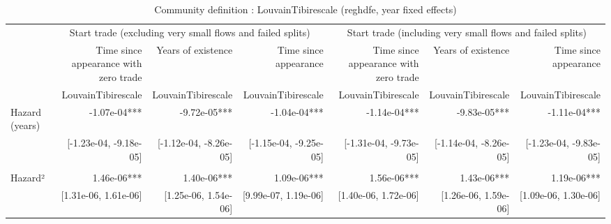 \begin{table}[!h]
\caption{Community definition : LouvainTibirescale (reghdfe, year fixed effects)}
\centering
\begin{tabular}{lllllll}
\cline{1-7}
\multicolumn{1}{c}{} &
  \multicolumn{3}{|c}{Start trade (excluding very small flows and failed splits)} &
  \multicolumn{3}{c}{Start trade (including very small flows and failed splits)} \\
\multicolumn{1}{c}{} &
  \multicolumn{1}{|r}{Time since appearance with zero trade} &
  \multicolumn{1}{r}{Years of existence} &
  \multicolumn{1}{r}{Time since appearance} &
  \multicolumn{1}{r}{Time since appearance with zero trade} &
  \multicolumn{1}{r}{Years of existence} &
  \multicolumn{1}{r}{Time since appearance} \\
\multicolumn{1}{c}{} &
  \multicolumn{1}{|r}{LouvainTibirescale} &
  \multicolumn{1}{r}{LouvainTibirescale} &
  \multicolumn{1}{r}{LouvainTibirescale} &
  \multicolumn{1}{r}{LouvainTibirescale} &
  \multicolumn{1}{r}{LouvainTibirescale} &
  \multicolumn{1}{r}{LouvainTibirescale} \\
\cline{1-7}
\multicolumn{1}{l}{Hazard (years)} &
  \multicolumn{1}{|r}{-1.07e-04***} &
  \multicolumn{1}{r}{-9.72e-05***} &
  \multicolumn{1}{r}{-1.04e-04***} &
  \multicolumn{1}{r}{-1.14e-04***} &
  \multicolumn{1}{r}{-9.83e-05***} &
  \multicolumn{1}{r}{-1.11e-04***} \\
\multicolumn{1}{l}{} &
  \multicolumn{1}{|r}{[-1.23e-04, -9.18e-05]} &
  \multicolumn{1}{r}{[-1.12e-04, -8.26e-05]} &
  \multicolumn{1}{r}{[-1.15e-04, -9.25e-05]} &
  \multicolumn{1}{r}{[-1.31e-04, -9.73e-05]} &
  \multicolumn{1}{r}{[-1.14e-04, -8.26e-05]} &
  \multicolumn{1}{r}{[-1.23e-04, -9.83e-05]} \\
\multicolumn{1}{l}{} &
  \multicolumn{1}{|r}{} &
  \multicolumn{1}{r}{} &
  \multicolumn{1}{r}{} &
  \multicolumn{1}{r}{} &
  \multicolumn{1}{r}{} &
  \multicolumn{1}{r}{} \\
\multicolumn{1}{l}{Hazard²} &
  \multicolumn{1}{|r}{1.46e-06***} &
  \multicolumn{1}{r}{1.40e-06***} &
  \multicolumn{1}{r}{1.09e-06***} &
  \multicolumn{1}{r}{1.56e-06***} &
  \multicolumn{1}{r}{1.43e-06***} &
  \multicolumn{1}{r}{1.19e-06***} \\
\multicolumn{1}{l}{} &
  \multicolumn{1}{|r}{[1.31e-06,  1.61e-06]} &
  \multicolumn{1}{r}{[1.25e-06,  1.54e-06]} &
  \multicolumn{1}{r}{[9.99e-07,  1.19e-06]} &
  \multicolumn{1}{r}{[1.40e-06,  1.72e-06]} &
  \multicolumn{1}{r}{[1.26e-06,  1.59e-06]} &
  \multicolumn{1}{r}{[1.09e-06,  1.30e-06]} \\

\end{tabular}
\end{table}
